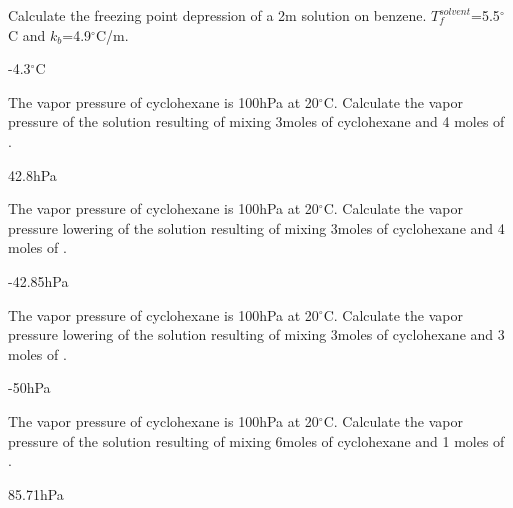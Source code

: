 \documentclass[main.tex]{subfiles}
\begin{document}
\begin{multicols*}{2}
\begin{question}[ID=\the\value{numA}]
Calculate the freezing point depression of a 2m  solution on benzene. $T^{solvent}_f$=5.5$^{\circ}$C and $k_b$=4.9$^{\circ}$C/m.
\end{question}
\begin{solution}
-4.3$^{\circ}$C
\hspace{0.1cm}\end{solution}%


\begin{question}[ID=\the\value{numA}]
The vapor pressure of cyclohexane is 100hPa at 20$^{\circ}$C. Calculate the vapor pressure of the solution resulting of mixing 3moles of cyclohexane and 4 moles of .
\end{question}
\begin{solution}
42.8hPa
\hspace{0.1cm}\end{solution}%

\begin{question}[ID=\the\value{numA}]
The vapor pressure of cyclohexane is 100hPa at 20$^{\circ}$C. Calculate the vapor pressure lowering of the solution resulting of mixing 3moles of cyclohexane and 4 moles of .
\end{question}
\begin{solution}
-42.85hPa
\hspace{0.1cm}\end{solution}%



\begin{question}[ID=\the\value{numA}]
The vapor pressure of cyclohexane is 100hPa at 20$^{\circ}$C. Calculate the vapor pressure lowering of the solution resulting of mixing 3moles of cyclohexane and 3 moles of .
\end{question}
\begin{solution}
-50hPa
\hspace{0.1cm}\end{solution}%


\begin{question}[ID=\the\value{numA}]
The vapor pressure of cyclohexane is 100hPa at 20$^{\circ}$C. Calculate the vapor pressure of the solution resulting of mixing 6moles of cyclohexane and 1 moles of .
\end{question}
\begin{solution}
85.71hPa
\hspace{0.1cm}\end{solution}%


\end{multicols*}
\end{document}

